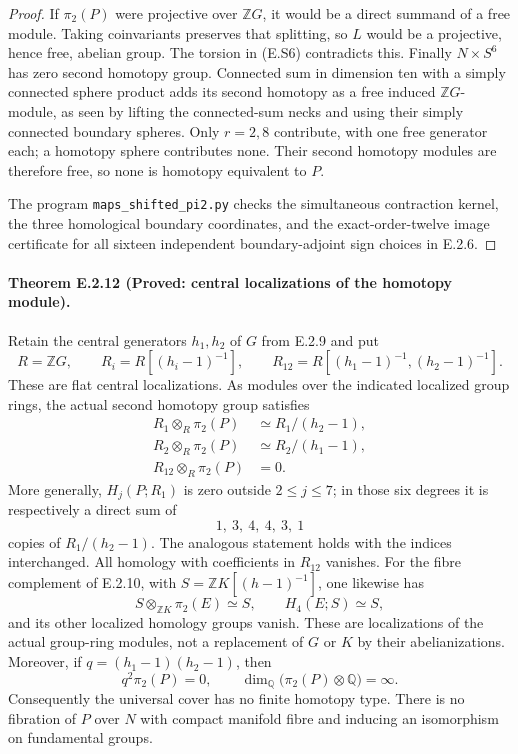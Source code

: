 \begin{proof}
If $\pi_2(P)$ were projective over $\mathbb ZG$, it would be
a direct summand of a free module. Taking coinvariants preserves
that splitting, so $L$ would be a projective, hence free,
abelian group. The torsion in (E.S6) contradicts this. Finally
$N\times S^6$ has zero second homotopy group. Connected sum in
dimension ten with a simply connected sphere product adds its
second homotopy as a free induced $\mathbb ZG$-module, as seen
by lifting the connected-sum necks and using their simply
connected boundary spheres. Only $r=2,8$ contribute, with one
free generator each; a homotopy sphere contributes none.
Their second homotopy modules are therefore free, so none is
homotopy equivalent to $P$.

The program \texttt{maps\_shifted\_pi2.py} checks the simultaneous
contraction kernel, the three homological boundary coordinates,
and the exact-order-twelve image certificate for all sixteen
independent boundary-adjoint sign choices in E.2.6.
\end{proof}

\paragraph{Theorem E.2.12 (Proved: central localizations of the homotopy module).}
Retain the central generators $h_1,h_2$ of $G$ from E.2.9 and put
\[
 R=\mathbb ZG,\qquad R_i=R[(h_i-1)^{-1}],\qquad
              R_{12}=R[(h_1-1)^{-1},(h_2-1)^{-1}].
 \tag{E.S13}
\]
These are flat central localizations. As modules over the indicated
localized group rings, the actual second homotopy group satisfies
\[
 \begin{split}
 R_1\otimes_R\pi_2(P)&\simeq R_1/(h_2-1),\\
 R_2\otimes_R\pi_2(P)&\simeq R_2/(h_1-1),\\
 R_{12}\otimes_R\pi_2(P)&=0.
 \end{split}
 \tag{E.S14}
\]
More generally, $H_j(P;R_1)$ is zero outside $2\leq j\leq7$;
in those six degrees it is respectively a direct sum of
\[
                  1,\ 3,\ 4,\ 4,\ 3,\ 1
 \tag{E.S15}
\]
copies of $R_1/(h_2-1)$. The analogous statement holds with the
indices interchanged. All homology with coefficients in $R_{12}$
vanishes. For the fibre complement of E.2.10, with
$S=\mathbb ZK[(h-1)^{-1}]$, one likewise has
\[
             S\otimes_{\mathbb ZK}\pi_2(E)\simeq S,
       \qquad H_4(E;S)\simeq S,
 \tag{E.S16}
\]
and its other localized homology groups vanish. These are
localizations of the actual group-ring modules, not a replacement
of $G$ or $K$ by their abelianizations. Moreover, if
$q=(h_1-1)(h_2-1)$, then
\[
                  q^2\pi_2(P)=0,
        \qquad \dim_{\mathbb Q}\bigl(\pi_2(P)\otimes\mathbb Q\bigr)
                     =\infty.
 \tag{E.S20}
\]
Consequently the universal cover has no finite homotopy type.
There is no fibration of $P$ over $N$ with compact manifold fibre
and inducing an isomorphism on fundamental groups.


